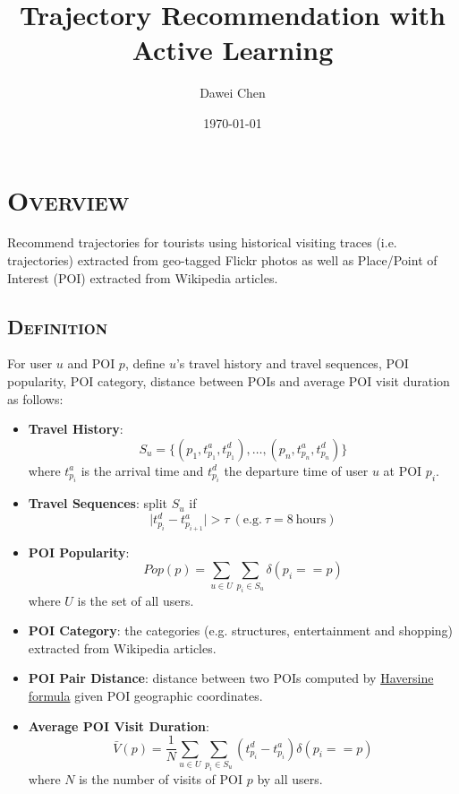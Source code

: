 \documentclass[11pt, a4paper]{article}
\title{Trajectory Recommendation with Active Learning}
\author{Dawei Chen}
\date{\today}
\begin{document}
\maketitle

\section{\textsc{Overview}}
Recommend trajectories for tourists using historical visiting traces (i.e. trajectories) extracted from geo-tagged Flickr photos 
as well as Place/Point of Interest (POI) extracted from Wikipedia articles.

\subsection{\textsc{Definition}}
For user $u$ and POI $p$, define $u$'s travel history and travel sequences, 
POI popularity, POI category, distance between POIs and average POI visit duration as follows\cite{lim15}:
\begin{itemize}
\item \textbf{Travel History}:
      \begin{equation*}
      S_u = \{(p_1, t_{p_1}^a, t_{p_1}^d), \dots, (p_n, t_{p_n}^a, t_{p_n}^d)\}
      \end{equation*}
      where $t_{p_i}^a$ is the arrival time and $t_{p_i}^d$ the departure time of user $u$ at POI $p_i$.
\item \textbf{Travel Sequences}: split $S_u$ if
      \begin{equation*}
      \lvert t_{p_i}^d - t_{p_{i+1}}^a \rvert > \tau ~(\text{e.g.}~ \tau = 8 ~\text{hours})
      \end{equation*}
\item \textbf{POI Popularity}:
      \begin{equation*}
      Pop(p) = \sum_{u \in U} \sum_{p_i \in S_u} \delta(p_i == p)
      \end{equation*}
      where $U$ is the set of all users.
\item \textbf{POI Category}: the categories (e.g. structures, entertainment and shopping) extracted from Wikipedia articles.
\item \textbf{POI Pair Distance}: distance between two POIs computed by
      \href{https://en.wikipedia.org/wiki/Great-circle\_distance#Computational\_formulas}{Haversine formula}
      given POI geographic coordinates.
\item \textbf{Average POI Visit Duration}:
      \begin{equation}
      \bar{V}(p) = \frac{1}{N} \sum_{u \in U} \sum_{p_i \in S_u} (t_{p_i}^d - t_{p_i}^a) \delta(p_i == p)
      \end{equation}
      where $N$ is the number of visits of POI $p$ by all users.
\end{itemize}
\end{document}
